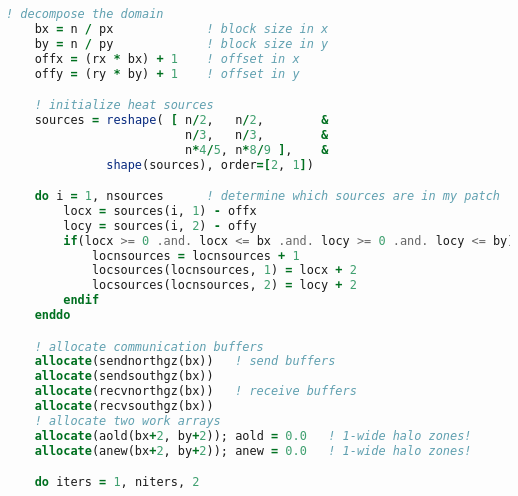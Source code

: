 \begin{lstlisting}[language=Fortran, caption={Parallel F2PY implementation of the stencil test case - F90 module code.}]
    ! decompose the domain   
    bx = n / px             ! block size in x
    by = n / py             ! block size in y
    offx = (rx * bx) + 1    ! offset in x
    offy = (ry * by) + 1    ! offset in y

    ! initialize heat sources
    sources = reshape( [ n/2,   n/2,        &
                         n/3,   n/3,        &
                         n*4/5, n*8/9 ],    &
              shape(sources), order=[2, 1])

    do i = 1, nsources      ! determine which sources are in my patch
        locx = sources(i, 1) - offx
        locy = sources(i, 2) - offy    
        if(locx >= 0 .and. locx <= bx .and. locy >= 0 .and. locy <= by) then
            locnsources = locnsources + 1
            locsources(locnsources, 1) = locx + 2
            locsources(locnsources, 2) = locy + 2
        endif
    enddo

    ! allocate communication buffers
    allocate(sendnorthgz(bx))   ! send buffers
    allocate(sendsouthgz(bx))
    allocate(recvnorthgz(bx))   ! receive buffers
    allocate(recvsouthgz(bx))
    ! allocate two work arrays
    allocate(aold(bx+2, by+2)); aold = 0.0   ! 1-wide halo zones!
    allocate(anew(bx+2, by+2)); anew = 0.0   ! 1-wide halo zones!

    do iters = 1, niters, 2


\end{lstlisting}
